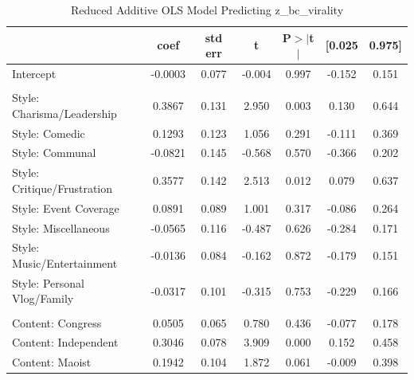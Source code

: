 \documentclass[12pt,a4paper]{report}
\begin{document}
\begin{table}
    \centering
    \captionsetup{justification=centering}
    \caption{Reduced Additive OLS Model Predicting z\_bc\_virality}
    \label{tab:ols_virality_main}
    \scriptsize
    \setlength{\tabcolsep}{3pt}

    \begin{tabular}{@{}l S[table-format=-1.4] S[table-format=1.3] S[table-format=-1.3] S[table-format=1.3] S[table-format=-1.3] S[table-format=1.3]@{}}
        \toprule
        & {\textbf{coef}} & {\textbf{std err}} & {\textbf{t}} & {\textbf{P$> |$t$|$}} & {\textbf{[0.025}} & {\textbf{0.975]}} \\
        \midrule
        Intercept                            & -0.0003 & 0.077 & -0.004 & 0.997 & -0.152 & 0.151 \\
        \addlinespace
         \\ \addlinespace
        Style: Charisma/Leadership           & 0.3867  & 0.131 & 2.950  & 0.003 & 0.130  & 0.644 \\
        Style: Comedic                       & 0.1293  & 0.123 & 1.056  & 0.291 & -0.111 & 0.369 \\
        Style: Communal                      & -0.0821 & 0.145 & -0.568 & 0.570 & -0.366 & 0.202 \\
        Style: Critique/Frustration          & 0.3577  & 0.142 & 2.513  & 0.012 & 0.079  & 0.637 \\
        Style: Event Coverage                & 0.0891  & 0.089 & 1.001  & 0.317 & -0.086 & 0.264 \\
        Style: Miscellaneous                 & -0.0565 & 0.116 & -0.487 & 0.626 & -0.284 & 0.171 \\
        Style: Music/Entertainment           & -0.0136 & 0.084 & -0.162 & 0.872 & -0.179 & 0.151 \\
        Style: Personal Vlog/Family          & -0.0317 & 0.101 & -0.315 & 0.753 & -0.229 & 0.166 \\
        \addlinespace
         \\ \addlinespace
        Content: Congress                    & 0.0505  & 0.065 & 0.780  & 0.436 & -0.077 & 0.178 \\
        Content: Independent                 & 0.3046  & 0.078 & 3.909  & 0.000 & 0.152  & 0.458 \\
        Content: Maoist                      & 0.1942  & 0.104 & 1.872  & 0.061 & -0.009 & 0.398 \\

\end{tabular}
\end{table}
\end{document}
